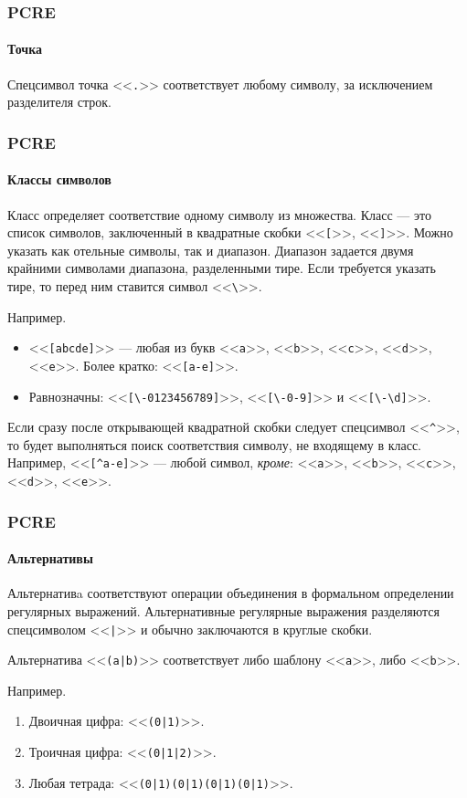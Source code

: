 \begin{frame}[fragile]
    \frametitle{PCRE}
    \framesubtitle{Точка}

    Спецсимвол точка <<\verb".">> соответствует любому символу, за исключением разделителя строк.
\end{frame}

\begin{frame}[fragile]
    \frametitle{PCRE}
    \framesubtitle{Классы символов}
    
    \alert{Класс} определяет соответствие одному символу из множества. Класс --- это список символов, заключенный в квадратные скобки <<\verb"[">>, <<\verb"]">>. Можно указать как отельные символы, так и диапазон. Диапазон задается двумя крайними символами диапазона, разделенными тире. Если требуется указать тире, то перед ним ставится символ <<\verb"\">>. 
    
    Например.
    \begin{itemize}
        \item{} <<\verb"[abcde]">> --- любая из букв <<\verb"а">>, <<\verb"b">>, <<\verb"c">>, <<\verb"d">>, <<\verb"e">>. Более кратко: <<\verb"[a-e]">>.
        \item Равнозначны: <<\verb"[\-0123456789]">>, <<\verb"[\-0-9]">> и <<\verb"[\-\d]">>.
    \end{itemize}
     Если сразу после открывающей квадратной скобки следует спецсимвол <<\verb"^">>, то будет выполняться поиск соответствия символу, не входящему в класс. Например, <<\verb"[^a-e]">> --- любой символ, \emph{кроме}: <<\verb"а">>, <<\verb"b">>, <<\verb"c">>, <<\verb"d">>, <<\verb"e">>.
\end{frame}


\begin{frame}[fragile]
    \frametitle{PCRE}
    \framesubtitle{Альтернативы}
    
    \alert{Альтернативa} соответствуют операции объединения в формальном определении регулярных выражений. Альтернативные регулярные выражения разделяются спецсимволом <<\verb"|">> и обычно заключаются в круглые скобки.

    Альтернатива <<\verb"(a|b)">> соответствует либо шаблону <<\verb"a">>, либо <<\verb"b">>.
    
    Например.
    \begin{enumerate}
        \item Двоичная цифра: <<\verb"(0|1)">>.
        \item Троичная цифра: <<\verb"(0|1|2)">>.
        \item Любая тетрада:  <<\verb"(0|1)(0|1)(0|1)(0|1)">>.
    \end{enumerate}
\end{frame}



